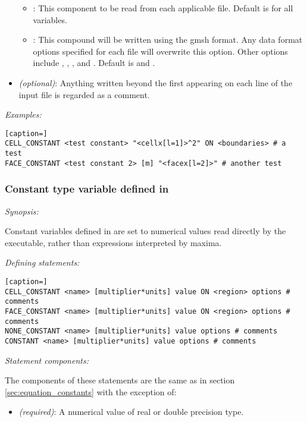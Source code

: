 \begin{itemize}
\begin{itemize}
%
\item {}:  This component to be read from each applicable  file.  Default is  for all variables.
%
\item {}:  This compound will be written using the gmsh  format.  Any data format options specified for each  file will overwrite this option.  Other options include , , ,   and .  Default is  and .
%
\end{itemize}
%
\item {} \emph{(optional)}:  Anything written beyond the first \code{\#} appearing on each line of the input file is regarded as a comment.
\end{itemize}

\emph{Examples:}

\begin{lstlisting}[caption=]
CELL_CONSTANT <test constant> "<cellx[l=1]>^2" ON <boundaries> # a test
FACE_CONSTANT <test constant 2> [m] "<facex[l=2]>" # another test
\end{lstlisting}

\subsubsection{Constant type variable defined in }

\emph{Synopsis:}

Constant variables defined in  are set to numerical values read directly by the  executable, rather than expressions interpreted by maxima.

\emph{Defining statements:}

\begin{lstlisting}[caption=]
CELL_CONSTANT <name> [multiplier*units] value ON <region> options # comments
FACE_CONSTANT <name> [multiplier*units] value ON <region> options # comments
NONE_CONSTANT <name> [multiplier*units] value options # comments
CONSTANT <name> [multiplier*units] value options # comments
\end{lstlisting}

\emph{Statement components:}

The components of these statements are the same as in section \ref{sec:equation_constants} with the exception of:
\begin{itemize}
\item {} \emph{(required)}:  A numerical value of real or double precision type.
\end{itemize}

